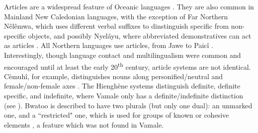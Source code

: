 Articles are a widespread feature of Oceanic languages \parencite[38]{lynch_oceanic_2002}. They are also common in Mainland New Caledonian languages, with the exception of Far Northern Nêlêmwa, which uses different verbal suffixes to dinstinguish specific from non-specific objects, and possibly Nyelâyu, where abbreviated demonstratives can act as articles \parencite[43]{ozanne-rivierre_nyelayu_1998}. All Northern languages use articles, from Jawe \parencite[255]{haudricourt_dictionnaire_1982} to Paicî \parencite[177]{rivierre_dictionnaire_1983}. Interestingly, though language contact and multilingualism were common and encouraged until at least the early 20\textsuperscript{th} century, article systems are not identical. Cèmuhî, for example, distinguishes nouns along personified/neutral and female/non-female axes \parencite[144]{rivierre_langue_1980}. The Hienghène systems distinguish definite, definite specific, and indefinite, where Vamale only has a definite/indefinite distinction (see ). Bwatoo is described to have two plurals (but only one dual): an unmarked one, and a ``restricted" one, which is used for groups of known or cohesive elements \parencite[42]{rivierre_bwatoo_2006}, a feature which was not found in Vamale.

